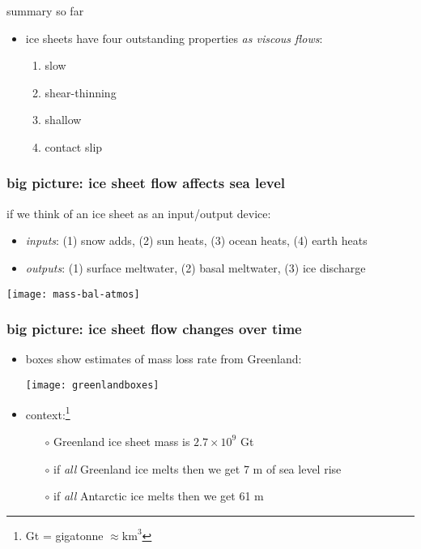 \documentclass{beamer}
\begin{document}
\begin{frame}{summary so far}

\begin{itemize}
\item ice sheets have four outstanding properties \emph{as viscous flows}:
  \begin{enumerate}
  \item \alert{slow}
  \item \alert{shear-thinning}
  \item \alert{shallow}
  \item \alert{contact slip}
  \end{enumerate}
\end{itemize}
\end{frame}


\begin{frame}
  \frametitle{big picture: ice sheet flow affects sea level}

\medskip
\small
if we think of an ice sheet as an input/output device:
\begin{itemize}
\item \emph{inputs}: (1) snow adds, (2) sun heats, (3) ocean heats, (4) earth heats
\item \emph{outputs}: (1) surface meltwater, (2) basal meltwater, (3) ice discharge
\end{itemize}

\begin{center}
  \texttt{[image: mass-bal-atmos]}

\end{center}
\end{frame}


\begin{frame}
  \frametitle{big picture: ice sheet flow changes over time}

\small
\begin{itemize}
\item boxes show estimates of mass loss rate from Greenland:
\begin{center}
    \texttt{[image: greenlandboxes]}
\end{center}

\vspace{-0.21in}
\item context:\footnote{Gt = gigatonne $\approx \text{km}^3$}
  \begin{itemize}
  \item[$\circ$]  Greenland ice sheet mass is $2.7 \times 10^9$ Gt %
  \item[$\circ$]  if \emph{all} Greenland ice melts then we get 7 m of sea level rise
  \item[$\circ$]  if \emph{all} Antarctic ice melts then we get 61 m
  \end{itemize}
\end{itemize}
\end{frame}
\end{document}
